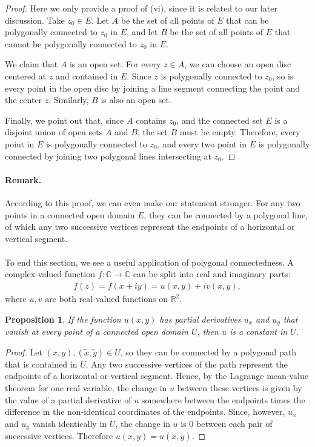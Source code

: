\documentclass{article}
\numberwithin{equation}{section}
\newcommand{\bbC}{\mathbb{C}}
\newcommand{\bbR}{\mathbb{R}}
\newcommand{\wt}{\widetilde}
\theoremstyle{plain}
\newtheorem{proposition}[theorem]{Proposition}
\theoremstyle{definition}
\begin{document}
\begin{proof}
Here we only provide a proof of (vi), since it is related to our later discussion. Take $z_0\in E$. Let $A$ be the set of all points of $E$ that can be polygonally connected to $z_0$ in $E$, and let $B$ be the set of all points of $E$ that cannot be polygonally connected to $z_0$ in $E$. 

We claim that $A$ is an open set. For every $z\in A$, we can choose an open disc centered at $z$ and contained in $E$. Since $z$ is polygonally connected to $z_0$, so is every point in the open disc by joining a line segment connecting the point and the center $z$. Similarly, $B$ is also an open set.

Finally, we point out that, since $A$ contains $z_0$, and the connected set $E$ is a disjoint union of open sets $A$ and $B$, the set $B$ must be empty. Therefore, every point in $E$ is polygonally connected to $z_0$, and every two point in $E$ is polygonally connected by joining two polygonal lines intersecting at $z_0$.
\end{proof}

\paragraph{Remark.} According to this proof, we can even make our statement stronger. For any two points in a connected open domain $E$, they can be connected by a polygonal line, of which any two successive vertices represent the endpoints of a horizontal or vertical segment.


\paragraph{} To end this section, we see a useful application of polygonal connectedness. A complex-valued function $f:\bbC\to\bbC$ can be split into real and imaginary parts:
\begin{align*}
	f(z)=f(x+iy)=u(x,y)+iv(x,y),
\end{align*}
where $u,v$ are both real-valued functions on $\bbR^2$. 
\begin{proposition}
If the function $u(x,y)$ has partial derivatives $u_x$ and $u_y$ that vanish at every point of a connected open domain $U$, then $u$ is a constant in $U$.
\end{proposition}
\begin{proof}
Let $(x,y),(\wt x,\wt y)\in U$, so they can be connected by a polygonal path that is contained in $U$. Any two successive vertices of
the path represent the endpoints of a horizontal or vertical segment. Hence, by the Lagrange mean-value theorem for one real variable, the change in $u$ between these vertices is given by the value of a partial derivative of $u$ somewhere between the endpoints times the difference in the non-identical coordinates of the endpoints. Since, however, $u_x$ and $u_y$ vanish identically in $U$, the change in $u$ is 0 between each pair of successive vertices. Therefore $u(x,y)=u(\wt x,\wt y)$. 
\end{proof}
\end{document}

